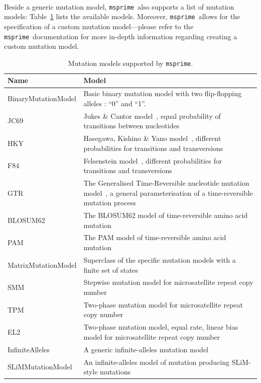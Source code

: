\documentclass[graybox]{svmult}
\newcommand{\msprime}[0]{\texttt{msprime}}
\begin{document}
 \

Beside a generic mutation model, \msprime\ also supports a list of mutation models: Table~\ref{tab:mutation-models}
lists the available models. Moreover, \msprime\ allows for the specification of a custom mutation model—please refer
to the \msprime\ documentation for more in-depth information regarding creating a custom mutation model.

\begin{table}[h]
\centering
\begin{tabular}{|l|p{8cm}|}
\hline
\textbf{Name} & \textbf{Model} \\
\hline
BinaryMutationModel & Basic binary mutation model with two flip-flopping alleles : “0” and “1”. \\
\hline
JC69 & Jukes \& Cantor model~\citep{jukes1969evolution}, equal probability of transitions between nucleotides \\
\hline
HKY & Hasegawa, Kishino \& Yano model~\citep{hasegawa_1985_dating}, different probabilities for transitions and transversions \\
\hline
F84 & Felsenstein model~\citep{felsenstein1996hidden}, different probabilities for transitions and transversions \\
\hline
GTR & The Generalised Time-Reversible nucleotide mutation model~\citep{tavare1986some}, a general parameterisation of a time-reversible mutation process \\
\hline
BLOSUM62 & The BLOSUM62 model of time-reversible amino acid mutation~\citep{henikoff1992amino} \\
\hline
PAM & The PAM model of time-reversible amino acid mutation~\citep{dayhoff1978} \\
\hline
MatrixMutationModel & Superclass of the specific mutation models with a finite set of states \\
\hline
SMM & Stepwise mutation model for microsatellite repeat copy number~\citep{kimura_1978_stepwise} \\
\hline
TPM & Two-phase mutation model for microsatellite repeat copy number~\citep{dirienzo_1994_mutational} \\
\hline
EL2 & Two-phase mutation model, equal rate, linear bias model for microsatellite repeat copy number~\citep{garza_1995_microsatellite} \\
\hline
InfiniteAlleles & A generic infinite-alleles mutation model \\
\hline
SLiMMutationModel & An infinite-alleles model of mutation producing SLiM-style mutations \\
\hline
\end{tabular}
\caption{Mutation models supported by \texttt{msprime}.}
\label{tab:mutation-models}
\end{table}
\end{document}
